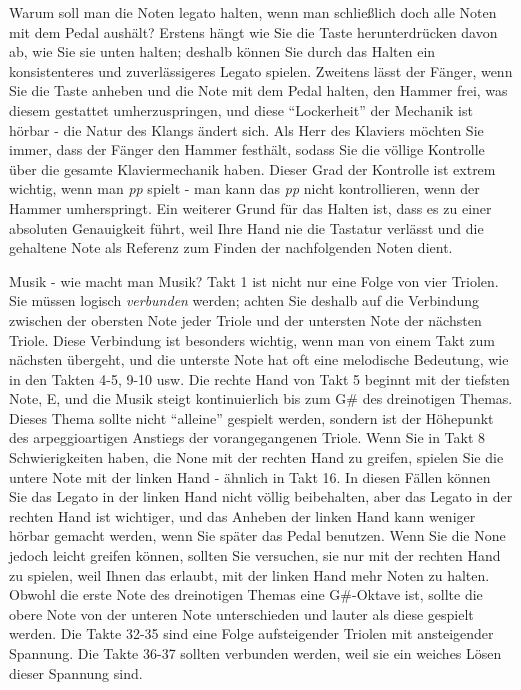 Warum soll man die Noten legato halten, wenn man schließlich doch alle Noten mit dem Pedal aushält?
Erstens hängt wie Sie die Taste herunterdrücken davon ab, wie Sie sie unten halten; deshalb können Sie durch das Halten ein konsistenteres und zuverlässigeres Legato spielen.
Zweitens lässt der Fänger, wenn Sie die Taste anheben und die Note mit dem Pedal halten, den Hammer frei, was diesem gestattet umherzuspringen, und diese \enquote{Lockerheit} der Mechanik ist hörbar - die Natur des Klangs ändert sich.
Als Herr des Klaviers möchten Sie immer, dass der Fänger den Hammer festhält, sodass Sie die völlige Kontrolle über die gesamte Klaviermechanik haben.
Dieser Grad der Kontrolle ist extrem wichtig, wenn man \textit{pp} spielt - man kann das \textit{pp} nicht kontrollieren, wenn der Hammer umherspringt.
Ein weiterer Grund für das Halten ist, dass es zu einer absoluten Genauigkeit führt, weil Ihre Hand nie die Tastatur verlässt und die gehaltene Note als Referenz zum Finden der nachfolgenden Noten dient.

Musik - wie macht man Musik?
Takt 1 ist nicht nur eine Folge von vier Triolen.
Sie müssen logisch \textit{verbunden} werden; achten Sie deshalb auf die Verbindung zwischen der obersten Note jeder Triole und der untersten Note der nächsten Triole.
Diese Verbindung ist besonders wichtig, wenn man von einem Takt zum nächsten übergeht, und die unterste Note hat oft eine melodische Bedeutung, wie in den Takten 4-5, 9-10 usw.
Die rechte Hand von Takt 5 beginnt mit der tiefsten Note, E, und die Musik steigt kontinuierlich bis zum G\# des dreinotigen Themas.
Dieses Thema sollte nicht \enquote{alleine} gespielt werden, sondern ist der Höhepunkt des arpeggioartigen Anstiegs der vorangegangenen Triole.
Wenn Sie in Takt 8 Schwierigkeiten haben, die None mit der rechten Hand zu greifen, spielen Sie die untere Note mit der linken Hand - ähnlich in Takt 16.
In diesen Fällen können Sie das Legato in der linken Hand nicht völlig beibehalten, aber das Legato in der rechten Hand ist wichtiger, und das Anheben der linken Hand kann weniger hörbar gemacht werden, wenn Sie später das Pedal benutzen.
Wenn Sie die None jedoch leicht greifen können, sollten Sie versuchen, sie nur mit der rechten Hand zu spielen, weil Ihnen das erlaubt, mit der linken Hand mehr Noten zu halten.
Obwohl die erste Note des dreinotigen Themas eine G\#-Oktave ist, sollte die obere Note von der unteren Note unterschieden und lauter als diese gespielt werden.
Die Takte 32-35 sind eine Folge aufsteigender Triolen mit ansteigender Spannung.
Die Takte 36-37 sollten verbunden werden, weil sie ein weiches Lösen dieser Spannung sind.

